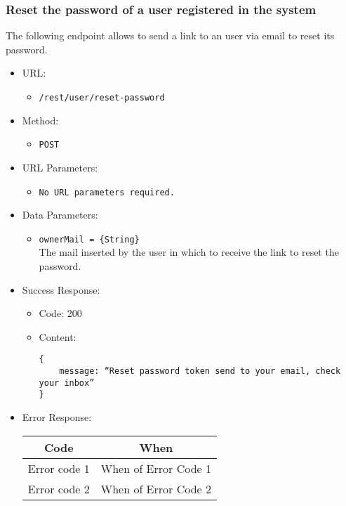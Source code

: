 \subsubsection*{Reset the password of a user registered in the system}

The following endpoint allows to send a link to an user via email to reset its password.

\begin{itemize}

    \item URL: 
    \begin{itemize}
        \item \texttt{/rest/user/reset-password}
    \end{itemize}
    
    \item Method: 
    \begin{itemize}
        \item \texttt{POST}
    \end{itemize}
    
    \item URL Parameters: 
    \begin{itemize}
        \item \texttt{No URL parameters required.} 
    \end{itemize}
    
    \item Data Parameters: 
    \begin{itemize}
        \item \texttt{ownerMail = \{String\}} \\
        The mail inserted by the user in which to receive the link to reset the password.    
    \end{itemize}
    
    \item Success Response: 
    \begin{itemize}
        \item Code: 200
        \item Content:
        \begin{lstlisting}
{
    message: “Reset password token send to your email, check your inbox”
}
        \end{lstlisting}
    \end{itemize}
    
    \item Error Response:
    \begin{table}[!h]
    \centering 
    \begin{tabular}{|c|c|}
    \hline
    \multicolumn{1}{|c|}{\textbf{Code}} & \multicolumn{1}{c|}{\textbf{When}} \\ \hline
    Error code 1 & When of Error Code 1 \\\hline
    Error code 2 & When of Error Code 2 \\\hline
    \end{tabular} 
    \end{table} 
    
\end{itemize}


